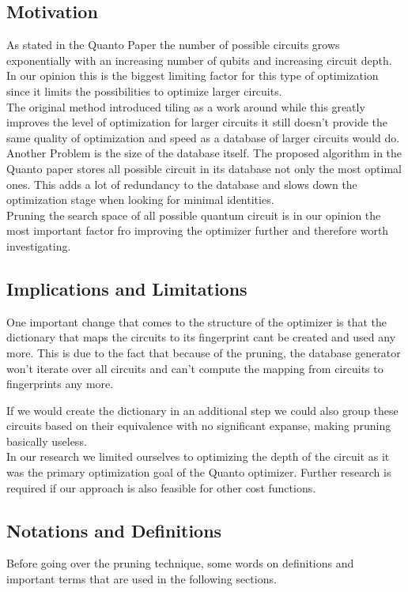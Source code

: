 \subsection{Motivation}
As stated in the Quanto Paper the number of possible circuits grows exponentially with an increasing number of qubits and
increasing circuit depth. In our opinion this is the biggest limiting factor for this type of optimization since it limits the possibilities to optimize larger circuits.\\

The original method introduced tiling as a work around while this greatly improves the level of optimization for larger circuits it still doesn't provide the same
quality of optimization and speed as a database of larger circuits would do.\\

Another Problem is the size of the database itself. The proposed algorithm in the Quanto paper stores all possible circuit in its database not only the most optimal ones. This adds a lot of redundancy to the database and slows down the optimization stage when looking for minimal identities.\\

Pruning the search space of all possible quantum circuit is in our opinion the most important factor fro improving the optimizer further and therefore worth investigating. 

\subsection{Implications and Limitations}
One important change that comes to the structure of the optimizer is that the dictionary that maps the circuits to its fingerprint cant be created and used any more. This is due to the fact that because of the pruning, the database generator won't iterate over all circuits and can't compute the mapping from circuits to fingerprints any more.

If we would create the dictionary in an additional step we could also group these circuits based on their equivalence with no significant expanse, making pruning basically useless.\\

In our research we limited ourselves to optimizing the depth of the circuit as it was the primary optimization goal of the Quanto optimizer. Further research is required if our approach is also feasible for other cost functions.

\subsection{Notations and Definitions}
Before going over the pruning technique, some words on definitions and important terms that are used in the following sections.

